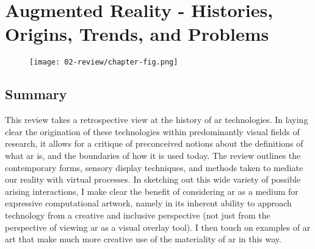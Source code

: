 \chapter{Augmented Reality - Histories, Origins, Trends, and Problems}
\label{sec: review}
\epigraph{\emph{}}{}

\begin{figure}
    \centering
    \texttt{[image: 02-review/chapter-fig.png]}
    \captionsetup{labelformat=empty}
    \caption[\autoref*{sec: review}'s page-figure: We AR in MoMA (from \citeauthor{veenhof2010}, \citeyear{veenhof2010}), Microsoft Hololens 2 in use by the U.S. Army (from \citeauthor{microsoft2021}, \citeyear{microsoft2021}), Project North Star (own photograph)]{}
\end{figure}

\clearpage
\section{Summary}\label{sec: review-summary}
This review takes a retrospective view at the history of \gls{ar} technologies. In laying clear the origination of these technologies within predominantly visual fields of research, it allows for a critique of preconceived notions about the definitions of what \gls{ar} is, and the boundaries of how it is used today. The review outlines the contemporary forms, sensory display techniques, and methods taken to mediate our reality with virtual processes. In sketching out this wide variety of possible arising interactions, I make clear the benefit of considering \gls{ar} as a medium for expressive computational artwork, namely in its inherent ability to approach technology from a creative and inclusive perspective (not just from the perspective of viewing \gls{ar} as a visual overlay tool). I then touch on examples of \gls{ar} art that make much more creative use of the materiality of \gls{ar} in this way.




